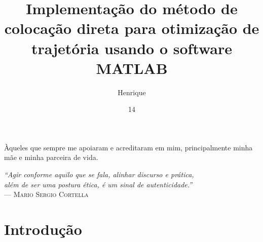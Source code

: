 \documentclass[dv, a4paper, tg]{ita}    %
\author{Henrique}{Silva Simplicio}
\title{Implementação do método de colocação direta para otimização de trajetória usando o software MATLAB}
\date{14}{novembro}{2024}
\begin{document}
\maketitle

\begin{itadedication}
Àqueles que sempre me apoiaram e acreditaram em mim, principalmente minha mãe e minha parceira de vida.
\end{itadedication}

\begin{itathanks}

\end{itathanks}

\thispagestyle{empty}
\ifhyperref{}\fi
\begin{flushright}
\begin{spacing}{1}
\mbox{}\vfill
{\sffamily\itshape
``Agir conforme aquilo que se fala, alinhar discurso e prática,\\
além de ser uma postura ética, é um sinal de autenticidade.''\\}
--- \textsc{Mario Sergio Cortella}
\end{spacing}
\end{flushright}

\begin{abstract}
\noindent

\end{abstract}

\begin{englishabstract}
\noindent

\end{englishabstract}

\listoffigures %


\listoflistings

\listofabbreviations


\tableofcontents

\mainmatter

\chapter{Introdução}
\label{cap:introdução}

\end{document}
